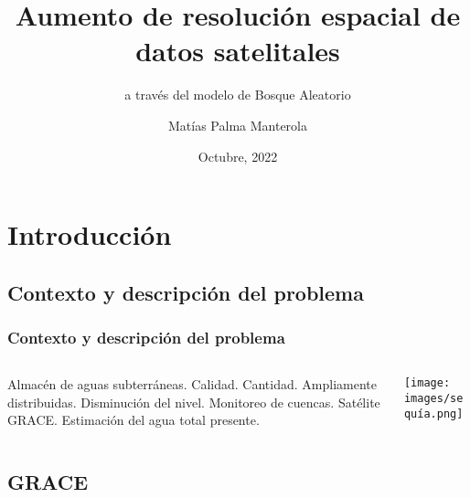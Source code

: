 \documentclass{beamer}
\title[Aumento de resolución a través del modelo \textit{Random Forest}] %
{Aumento de resolución espacial de datos satelitales}
\subtitle{a través del modelo de Bosque Aleatorio}
\author[] %
{Matías Palma Manterola}
\institute[UFRO] %
{
Universidad de La Frontera
}
\date[] %
{Octubre, 2022}
\begin{document}
  \frame{\titlepage}

  \section{Introducción}

  \subsection*{Contexto y descripción del problema}

  \begin{frame}
    \frametitle{Contexto y descripción del problema}

    \begin{columns}

      \begin{column}{0.5\textwidth}
        \begin{outline}
          \1 {Almacén de aguas subterráneas.}
            \2 Calidad.
            \2 Cantidad.
            \2 Ampliamente distribuidas.
            \2 Disminución del nivel.
          \1 {Monitoreo de cuencas.}
          \1 {Satélite GRACE.}
            \2 Estimación del agua total presente.
        \end{outline}
      \end{column}

      \begin{column}{0.5\textwidth}
        \begin{center}
          \texttt{[image: images/sequía.png]}
        \end{center}
      \end{column}

    \end{columns}

  \end{frame}

  \subsection*{GRACE}
\end{document}
